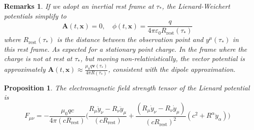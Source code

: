 \documentclass[a4paper]{article}
\newtheorem{remarks}{Remarks}[section]
\theoremstyle{new}
\newtheorem{prop}{Proposition}[section]
\begin{document}
\begin{remarks}
If we adopt an inertial rest frame at $\tau_*$, the Lienard-Weichert potentials simplify to
$$\mathbf{A}(t,\mathbf{x})=0,\quad\phi(t,\mathbf{x})=\frac{q}{4\pi\varepsilon_0R_{\text{rest}}(\tau_*)}$$
where $R_{\text{rest}}(\tau_*)$ is the distance between the observation point and $y^\mu(\tau_*)$ in this rest frame. As expected for a stationary point charge. In the frame where the charge is not at rest at $\tau_*$, but moving non-relativistically, the vector potential is approximately $\mathbf{A}(t,\mathbf{x})\approx\frac{\mu_0q\mathbf{v}(\tau_*)}{4\pi R(\tau_*)}$, consistent with the dipole approximation.
\end{remarks}
\begin{prop}
The electromagnetic field strength tensor of the Lienard potential is
$$F_{\mu\nu}=-\frac{\mu_0qc}{4\pi(cR_{\text{rest}})}\bigg(\frac{R_\mu\ddot{y}_\nu-R_\nu\ddot{y}_\mu}{(cR_{\text{rest}})}+\frac{(R_\mu\dot{y}_\nu-R_\nu\dot{y}_\mu)}{(cR_{\text{rest}})^2}(c^2+R^\alpha\ddot{y}_\alpha)\bigg)$$
\end{prop}
\end{document}
